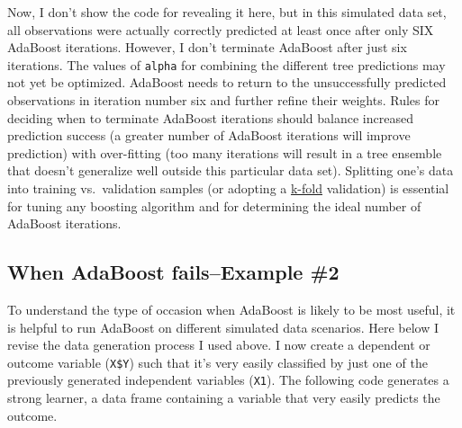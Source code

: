 \documentclass[]{tufte-handout}
\newenvironment{Shaded}{}{}
\newcommand{\KeywordTok}[1]{\textcolor[rgb]{0.00,0.44,0.13}{\textbf{#1}}}
\newcommand{\DecValTok}[1]{\textcolor[rgb]{0.25,0.63,0.44}{#1}}
\newcommand{\StringTok}[1]{\textcolor[rgb]{0.25,0.44,0.63}{#1}}
\newcommand{\CommentTok}[1]{\textcolor[rgb]{0.38,0.63,0.69}{\textit{#1}}}
\newcommand{\OperatorTok}[1]{\textcolor[rgb]{0.40,0.40,0.40}{#1}}
\newcommand{\NormalTok}[1]{#1}
\begin{document}
Now, I don't show the code for revealing it here, but in this simulated
data set, all observations were actually correctly predicted at least
once after only SIX AdaBoost iterations. However, I don't terminate
AdaBoost after just six iterations. The values of \texttt{alpha} for
combining the different tree predictions may not yet be optimized.
AdaBoost needs to return to the unsuccessfully predicted observations in
iteration number six and further refine their weights. Rules for
deciding when to terminate AdaBoost iterations should balance increased
prediction success (a greater number of AdaBoost iterations will improve
prediction) with over-fitting (too many iterations will result in a tree
ensemble that doesn't generalize well outside this particular data set).
Splitting one's data into training vs.~validation samples (or adopting a
\href{https://en.wikipedia.org/wiki/Cross-validation_(statistics)}{k-fold}
validation) is essential for tuning any boosting algorithm and for
determining the ideal number of AdaBoost iterations.

\subsection{When AdaBoost fails--Example
\#2}\label{when-adaboost-failsexample-2}

To understand the type of occasion when AdaBoost is likely to be most
useful, it is helpful to run AdaBoost on different simulated data
scenarios. Here below I revise the data generation process I used above.
I now create a dependent or outcome variable (\texttt{X\$Y}) such that
it's very easily classified by just one of the previously generated
independent variables (\texttt{X1}). The following code generates a
strong learner, a data frame containing a variable that very easily
predicts the outcome.

\begin{Shaded}
\end{Shaded}
\end{document}
